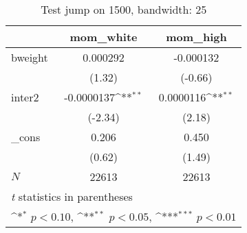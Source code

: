 \begin{table}[htbp]\centering
\def\sym#1{\ifmmode^{#1}\else\(^{#1}\)\fi}
\caption{Test jump on 1500, bandwidth: 25}
\begin{tabular}{l*{2}{c}}
\hline\hline
            &\multicolumn{1}{c}{mom\_white}&\multicolumn{1}{c}{mom\_high}\\
\hline
bweight     &    0.000292         &   -0.000132         \\
            &      (1.32)         &     (-0.66)         \\
[1em]
inter2      &  -0.0000137\sym{**} &   0.0000116\sym{**} \\
            &     (-2.34)         &      (2.18)         \\
[1em]
\_cons      &       0.206         &       0.450         \\
            &      (0.62)         &      (1.49)         \\
\hline
\(N\)       &       22613         &       22613         \\
\hline\hline
\multicolumn{3}{l}{\footnotesize \textit{t} statistics in parentheses}\\
\multicolumn{3}{l}{\footnotesize \sym{*} \(p<0.10\), \sym{**} \(p<0.05\), \sym{***} \(p<0.01\)}\\
\end{tabular}
\end{table}
